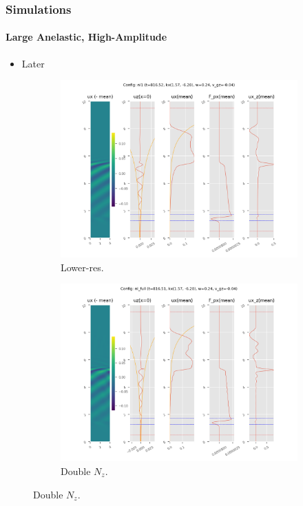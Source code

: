\documentclass[dvipsnames, 10pt]{beamer}
\begin{document}
\begin{frame}
    \frametitle{Simulations}
    \framesubtitle{Large Anelastic, High-Amplitude}

    \begin{itemize}
        \item Later
    \end{itemize}

    \begin{figure}[t]
        \centering
        \hspace*{-19mm}%
        \begin{subfigure}{0.53\textwidth}
            \centering
            \includegraphics[width=\textwidth]{nl_low_2.png}
            \caption{Lower-res.}
        \end{subfigure}
        \begin{subfigure}{0.53\textwidth}
            \centering
            \includegraphics[width=\textwidth]{nl_full_2.png}
            \caption{Double $N_z$.}
        \end{subfigure}
        \hspace*{-19mm}%
    \end{figure}
\end{frame}
\end{document}
